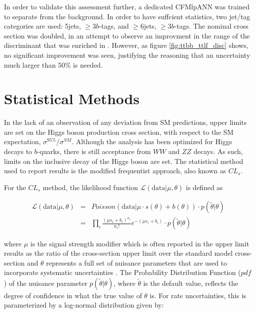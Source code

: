 \begin{description}
    In order to validate this assessment further, a dedicated CFMlpANN
    was trained to separate \ttbb from the \ttjets background.  In
    order to have suffcient statistics, two jet/tag categories are
    used: 5jets, $\ge$3$b$-tags, and $\ge$6jets, $\ge$3$b$-tags.  The
    nominal \ttbb cross section was doubled, in an attempt to observe
    an improvment in the range of the discriminant that was enriched
    in \ttbb.  However, as figure \ref{fig:ttbb_ttlf_disc} shows, no
    significant improvement was seen, justifying the reasoning that an
    uncertainty much larger  than 50\% is needed.  

\end{description}

\section{Statistical Methods}
\label{statistical_methods_overview}

\par In the lack of an observation of any deviation from SM
predictions, upper limits are set on the Higgs boson production cross
section, with respect to the SM expectation,
$\sigma^{95\%}$/$\sigma^{SM}$. Although the analysis has been
optimized for Higgs decays to $b$-quarks, there is still acceptance
from $WW$ and $ZZ$ decays.  As such, limits on the inclusive decay of
the Higgs boson are set.  The statistical method used to report
results is the modified frequentist approach, also known as
$CL_{s}$.

\par For the $CL_{s}$ method, the likelihood function
$\mathcal{L}(\mathrm{data}|\mu,\theta)$ is defined as  

\begin{eqnarray}\label{eq:Likelihood}
\mathcal{L}(\mathrm{data}|\mu,\theta)      & = & Poisson(\mathrm{data}|\mu \cdot s(\theta) + b(\theta)) \cdot p(\tilde{\theta}|\theta)  \\  
   								& = & \prod_{i} \frac{(\mu s_{i} + b_{i})^{n_{i}}}{n_{i}!} e^{-(\mu s_{i}+b_{i}) }  \cdot p(\tilde{\theta}|\theta) 
\end{eqnarray}

\noindent where $\mu$ is the signal strength modifier which is often
reported in the upper limit results as the ratio of the cross-section
upper limit over the standard model cross-section and $\theta$
represents a full set of nuisance parameters that are used to
incorporate systematic uncertainties \cite{CMS-NOTE-2011-005}.  
The Probability Distribution Function ($pdf$) of the nuisance parameter
$p(\tilde{\theta}|\theta)$, where $\tilde{\theta}$ is the default
value, reflects the degree of confidence in what the true value of
$\theta$ is.  For rate uncertainties, this is parameterized by a
log-normal distribution given by:

